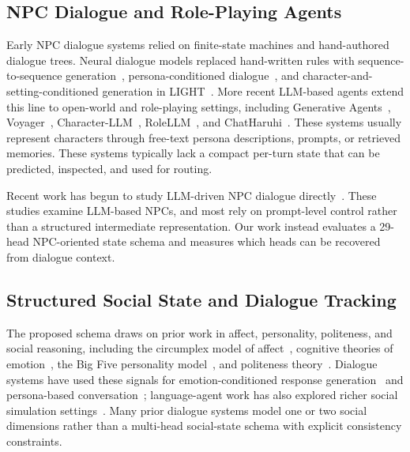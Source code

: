 \documentclass[11pt]{article}
\begin{document}
\subsection{NPC Dialogue and Role-Playing Agents}

Early NPC dialogue systems relied on finite-state machines and hand-authored dialogue trees.
Neural dialogue models replaced hand-written rules with sequence-to-sequence generation~\cite{bordes2017learning}, persona-conditioned dialogue~\cite{zhang2018personalizing}, and character-and-setting-conditioned generation in LIGHT~\cite{urbanek2019learning}.
More recent LLM-based agents extend this line to open-world and role-playing settings, including Generative Agents~\cite{park2023generative}, Voyager~\cite{wang2023voyager}, Character-LLM~\cite{shao2023character}, RoleLLM~\cite{wang2024rolellm}, and ChatHaruhi~\cite{li2023chatharuhi}.
These systems usually represent characters through free-text persona descriptions, prompts, or retrieved memories.
These systems typically lack a compact per-turn state that can be predicted, inspected, and used for routing.

Recent work has begun to study LLM-driven NPC dialogue directly~\cite{rimer2025talking,buakhaw2025deflanderization,ploug2025open}.
These studies examine LLM-based NPCs, and most rely on prompt-level control rather than a structured intermediate representation.
Our work instead evaluates a 29-head NPC-oriented state schema and measures which heads can be recovered from dialogue context.

\subsection{Structured Social State and Dialogue Tracking}

The proposed schema draws on prior work in affect, personality, politeness, and social reasoning, including the circumplex model of affect~\cite{russell1980circumplex}, cognitive theories of emotion~\cite{oatley1987towards}, the Big Five personality model~\cite{digman1990personality}, and politeness theory~\cite{brown1987politeness}.
Dialogue systems have used these signals for emotion-conditioned response generation~\cite{zhou2018emotional} and persona-based conversation~\cite{li2016persona}; language-agent work has also explored richer social simulation settings~\cite{park2023generative,zhou2024sotopia,zhou2025social}.
Many prior dialogue systems model one or two social dimensions rather than a multi-head social-state schema with explicit consistency constraints.
\end{document}
